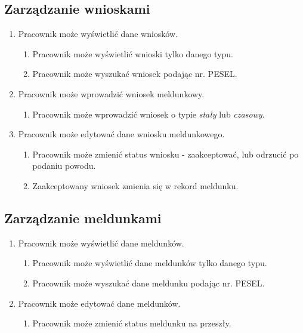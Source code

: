 \documentclass[12pt]{article}
\begin{document}
\subsection{Zarządzanie wnioskami}
\begin{enumerate}
    \item Pracownik może wyświetlić dane wniosków.
    \begin{enumerate}
        \item Pracownik może wyświetlić wnioski tylko danego typu.
        \item Pracownik może wyszukać wniosek podając nr. PESEL.
    \end{enumerate}
    \item Pracownik może wprowadzić wniosek meldunkowy.
    \begin{enumerate}
        \item Pracownik może wprowadzić wniosek o typie \textit{stały} lub \textit{czasowy}.
    \end{enumerate}
    \newpage
    \item Pracownik może edytować dane wniosku meldunkowego.
    \begin{enumerate}
        \item Pracownik może zmienić status wniosku - zaakceptować, lub odrzucić po podaniu powodu.
        \item Zaakceptowany wniosek zmienia się w rekord meldunku.
    \end{enumerate}
\end{enumerate}
\subsection{Zarządzanie meldunkami}
\begin{enumerate}
    \item Pracownik może wyświetlić dane meldunków.
    \begin{enumerate}
        \item Pracownik może wyświetlić dane meldunków tylko danego typu.
        \item Pracownik może wyszukać dane meldunku podając nr. PESEL.
    \end{enumerate}
    \item Pracownik może edytować dane meldunków.
    \begin{enumerate}
        \item Pracownik może zmienić status meldunku na przeszły.
    \end{enumerate}
\end{enumerate}
\end{document}
